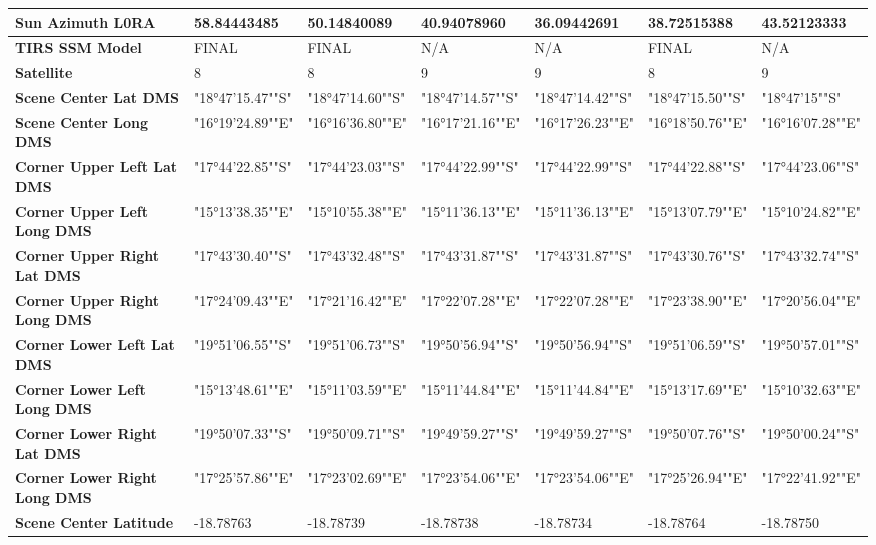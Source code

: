 \documentclass[climate,article,submit,pdftex,moreauthors]{Definitions/mdpi}
\begin{document}
\begin{table}
{\begin{tabular}{|l|l|l|l|l|l|l|}
        \textbf{Sun Azimuth L0RA} & 58.84443485 & 50.14840089 & 40.94078960 & 36.09442691 & 38.72515388 & 43.52123333 \\ \hline
        \textbf{TIRS SSM Model} & FINAL & FINAL & N/A & N/A & FINAL & N/A \\ \hline
        \textbf{Satellite} & 8 & 8 & 9 & 9 & 8 & 9 \\ \hline
        \textbf{Scene Center Lat DMS} & "18°47'15.47""S" & "18°47'14.60""S" & "18°47'14.57""S" & "18°47'14.42""S" & "18°47'15.50""S" & "18°47'15""S" \\ \hline
        \textbf{Scene Center Long DMS} & "16°19'24.89""E" & "16°16'36.80""E" & "16°17'21.16""E" & "16°17'26.23""E" & "16°18'50.76""E" & "16°16'07.28""E" \\ \hline
        \textbf{Corner Upper Left Lat DMS} & "17°44'22.85""S" & "17°44'23.03""S" & "17°44'22.99""S" & "17°44'22.99""S" & "17°44'22.88""S" & "17°44'23.06""S" \\ \hline
        \textbf{Corner Upper Left Long DMS} & "15°13'38.35""E" & "15°10'55.38""E" & "15°11'36.13""E" & "15°11'36.13""E" & "15°13'07.79""E" & "15°10'24.82""E" \\ \hline
        \textbf{Corner Upper Right Lat DMS} & "17°43'30.40""S" & "17°43'32.48""S" & "17°43'31.87""S" & "17°43'31.87""S" & "17°43'30.76""S" & "17°43'32.74""S" \\ \hline
        \textbf{Corner Upper Right Long DMS} & "17°24'09.43""E" & "17°21'16.42""E" & "17°22'07.28""E" & "17°22'07.28""E" & "17°23'38.90""E" & "17°20'56.04""E" \\ \hline
        \textbf{Corner Lower Left Lat DMS} & "19°51'06.55""S" & "19°51'06.73""S" & "19°50'56.94""S" & "19°50'56.94""S" & "19°51'06.59""S" & "19°50'57.01""S" \\ \hline
        \textbf{Corner Lower Left Long DMS} & "15°13'48.61""E" & "15°11'03.59""E" & "15°11'44.84""E" & "15°11'44.84""E" & "15°13'17.69""E" & "15°10'32.63""E" \\ \hline
        \textbf{Corner Lower Right Lat DMS} & "19°50'07.33""S" & "19°50'09.71""S" & "19°49'59.27""S" & "19°49'59.27""S" & "19°50'07.76""S" & "19°50'00.24""S" \\ \hline
        \textbf{Corner Lower Right Long DMS} & "17°25'57.86""E" & "17°23'02.69""E" & "17°23'54.06""E" & "17°23'54.06""E" & "17°25'26.94""E" & "17°22'41.92""E" \\ \hline
        \textbf{Scene Center Latitude} & -18.78763 & -18.78739 & -18.78738 & -18.78734 & -18.78764 & -18.78750 \\ \hline

\end{tabular}}
\end{table}
\end{document}

